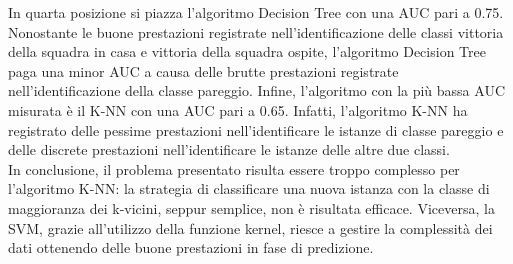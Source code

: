 In quarta posizione si piazza l'algoritmo Decision Tree con una AUC pari a 0.75. Nonostante le buone prestazioni registrate nell'identificazione delle classi vittoria della squadra in casa e vittoria della squadra ospite, l'algoritmo Decision Tree paga una minor AUC a causa delle brutte prestazioni registrate nell'identificazione della classe pareggio. Infine, l'algoritmo con la più bassa AUC misurata è il K-NN con una AUC pari a 0.65. Infatti, l'algoritmo K-NN ha registrato delle pessime prestazioni nell'identificare le istanze di classe pareggio e delle discrete prestazioni nell'identificare le istanze delle altre due classi.\\
In conclusione, il problema presentato risulta essere troppo complesso per l'algoritmo K-NN: la strategia di classificare una nuova istanza con la classe di maggioranza dei k-vicini, seppur semplice, non è risultata efficace. Viceversa, la SVM, grazie all'utilizzo della funzione kernel, riesce a gestire la complessità dei dati ottenendo delle buone prestazioni in fase di predizione.
